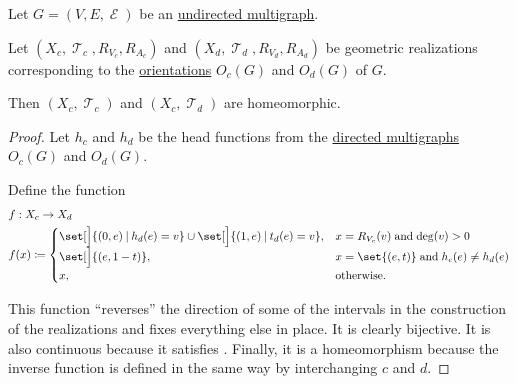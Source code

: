 \begin{proposition}\label{thm:undirected_multigraph_geometric_realizations_homeomorphic}
  Let \( G = (V, E, \mscrE) \) be an \hyperref[def:undirected_multigraph]{undirected multigraph}.

  Let \( (X_c, \mscrT_c, R_{V_c}, R_{A_c}) \) and \( (X_d, \mscrT_d, R_{V_d}, R_{A_d}) \) be geometric realizations corresponding to the \hyperref[def:multigraph_orientation]{orientations} \( O_c(G) \) and \( O_d(G) \) of \( G \).

  Then \( (X_c, \mscrT_c) \) and \( (X_c, \mscrT_d) \) are homeomorphic.
\end{proposition}
\begin{proof}
  Let \( h_c \) and \( h_d \) be the head functions from the \hyperref[def:directed_multigraph]{directed multigraphs} \( O_c(G) \) and \( O_d(G) \).

  Define the function
  \begin{equation*}
    \begin{aligned}
      &f: X_c \to X_d \\
      &f(x) \coloneqq \begin{cases}
        \set[\Big]{ (0, e) \given h_d(e) = v } \cup \set[\Big]{ (1, e) \given t_d(e) = v }, &x = R_{V_c}(v) \T{and} \deg(v) > 0 \\
        \set[\Big]{ (e, 1 - t) },                                                           &x = \set{ (e, t) } \T{and} h_c(e) \neq h_d(e) \\
        x,                                                                                  &\T{otherwise.}
      \end{cases}
    \end{aligned}
  \end{equation*}

  This function \enquote{reverses} the direction of some of the intervals in the construction of the realizations and fixes everything else in place. It is clearly bijective. It is also continuous because it satisfies . Finally, it is a homeomorphism because the inverse function is defined in the same way by interchanging \( c \) and \( d \).
\end{proof}

